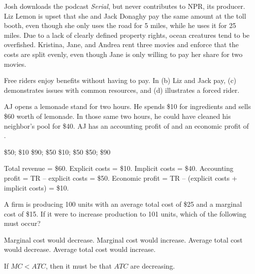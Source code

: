 \documentclass[addpoints,11pt]{exam}
\theoremstyle{definition}
\newcommand{\blank}[0]{\underline{\hspace{3cm}}}
\begin{document}
\begin{questions}
\begin{choices}
		\CorrectChoice Josh downloads the podcast \textit{Serial}, but never contributes to NPR, its producer.
		\choice Liz Lemon is upset that she and Jack Donaghy pay the same amount at the toll booth, even though she only uses the road for 5 miles, while he uses it for 25 miles.
		\choice Due to a lack of clearly defined property rights, ocean creatures tend to be overfished.
		\choice Kristina, Jane, and Andrea rent three movies and enforce that the costs are split evenly, even though Jane is only willing to pay her share for two movies.
	\end{choices}
	
	\begin{solution}
		Free riders enjoy benefits without having to pay. In (b) Liz and Jack pay, (c) demonstrates issues with common resources, and (d) illustrates a forced rider.
	\end{solution}
		
		\question AJ opens a lemonade stand for two hours. He spends \$10 for ingredients and sells \$60 worth of lemonade. In those same two hours, he could have cleaned his neighbor's pool for \$40. AJ has an accounting profit of \blank and an economic profit of \blank.
		
		\begin{choices}
			\CorrectChoice \$50; \$10
			\choice \$90; \$50
			\choice \$10; \$50
			\choice \$50; \$90
		\end{choices}
		
		\begin{solution}
			Total revenue = \$60. Explicit costs = \$10. Implicit costs = \$40. Accounting profit = TR -- explicit costs = \$50. Economic profit = TR -- (explicit costs + implicit costs) = \$10.
		\end{solution}
		
		\question A firm is producing 100 units with an average total cost of \$25 and a marginal cost of \$15. If it were to increase production to 101 units, which of the following must occur?
		
		\begin{choices}
			\choice Marginal cost would decrease.
			\choice Marginal cost would increase.
			\CorrectChoice Average total cost would decrease.
			\choice Average total cost would increase.
		\end{choices}
		
		\begin{solution}
			If $MC < ATC$, then it must be that $ATC$ are decreasing.
		\end{solution}
		

\end{questions}
\end{document}
